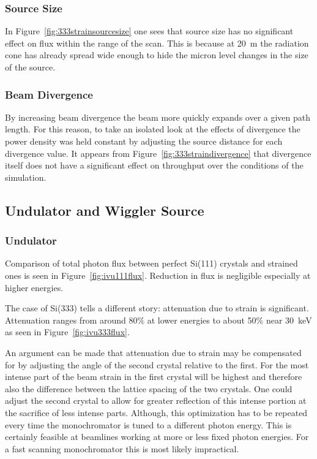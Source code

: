 \documentclass{iucr}
\begin{document}
\subsubsection{Source Size}
In Figure~\ref{fig:333strainsourcesize} one sees that source size has no significant effect on flux within the range of the scan. This is because at 20~m the radiation cone has already spread wide enough to hide the micron level changes in the size of the source.

\subsubsection{Beam Divergence}
By increasing beam divergence the beam more quickly expands over a given path length. For this reason, to take an isolated look at the effects of divergence the power density was held constant by adjusting the source distance for each divergence value. It appears from Figure~\ref{fig:333straindivergence} that divergence itself does not have a significant effect on throughput over the conditions of the simulation.

\subsection{Undulator and Wiggler Source}\label{undulatorwiggler}

\subsubsection{Undulator}
Comparison of total photon flux between perfect Si(111) crystals and strained ones is seen in Figure~\ref{fig:ivu111flux}. Reduction in flux is negligible especially at higher energies.

The case of Si(333) tells a different story: attenuation due to strain is significant. Attenuation ranges from around 80\% at lower energies to about 50\% near 30~keV as seen in Figure~\ref{fig:ivu333flux}.

An argument can be made that attenuation due to strain may be compensated for by adjusting the angle of the second crystal relative to the first. For the most intense part of the beam strain in the first crystal will be highest and therefore also the difference between the lattice spacing of the two crystals. One could adjust the second crystal to allow for greater reflection of this intense portion at the sacrifice of less intense parts. Although, this optimization has to be repeated every time the monochromator is tuned to a different photon energy. This is certainly feasible at beamlines working at more or less fixed photon energies. For a fast scanning monochromator this is most likely impractical.
\end{document}
